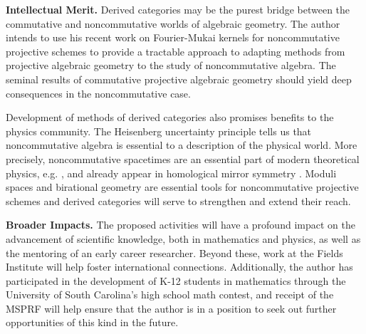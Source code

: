 \documentclass[11pt]{article}
\begin{document}



\noindent\textbf{Intellectual Merit.}
Derived categories may be the purest bridge between the commutative and noncommutative worlds of algebraic geometry.
The author intends to use his recent work on Fourier-Mukai kernels for noncommutative projective schemes to provide a tractable approach to adapting methods from projective algebraic geometry to the study of noncommutative algebra.
The seminal results of commutative projective algebraic geometry should yield deep consequences in the noncommutative case.

Development of methods of derived categories also promises benefits to the physics community.
The Heisenberg uncertainty principle tells us that noncommutative algebra is essential to a description of the physical world.
More precisely, noncommutative spacetimes are an essential part of modern theoretical physics, e.g. \cite{DoNe01}, and already appear in homological mirror symmetry \cite{AKO08}.
Moduli spaces and birational geometry are essential tools for noncommutative projective schemes and derived categories will serve to strengthen and extend their reach.

\noindent\textbf{Broader Impacts.}
The proposed activities will have a profound impact on the advancement of scientific knowledge, both in mathematics and physics, as well as the mentoring of an early career researcher.
Beyond these, work at the Fields Institute will help foster international connections.
Additionally, the author has participated in the development of K-12 students in mathematics through the University of South Carolina's high school math contest, and receipt of the MSPRF will help ensure that the author is in a position to seek out further opportunities of this kind in the future.

\end{document}
